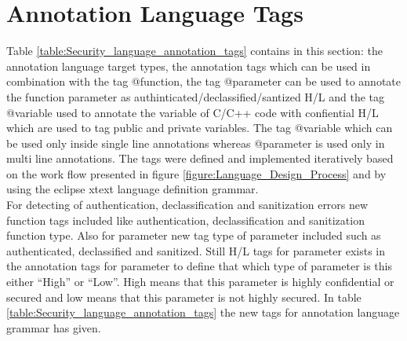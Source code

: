 \section{Annotation Language Tags}
Table \ref{table:Security_language_annotation_tags} contains in this section: the annotation language
target types, the annotation tags which can be used in
combination with the tag @function, the tag
@parameter can be used to annotate the function parameter as authinticated/declassified/santized H/L and the tag @variable used to annotate the variable of C/C++ code with confiential H/L which are used to tag public and private variables. The tag @variable which can be used only inside single line annotations whereas @parameter is used only in multi line annotations. The tags were
defined and implemented iteratively based on the work flow
presented in figure \ref{figure:Language_Design_Process} and by using the eclipse xtext \cite{ref_17_xtext:grammar} language
definition grammar.\\

For detecting of authentication, declassification and sanitization errors new function tags included like authentication, declassification and sanitization function type. Also for parameter new tag type of parameter included such as authenticated, declassified and sanitized. Still H/L tags for parameter exists in the annotation tags for parameter to define that which type of parameter is this either \enquote{High} or \enquote{Low}. High means that this parameter is highly confidential or secured and low means that this parameter is not highly secured. In table \ref{table:Security_language_annotation_tags} the new tags for annotation language grammar has given. 

